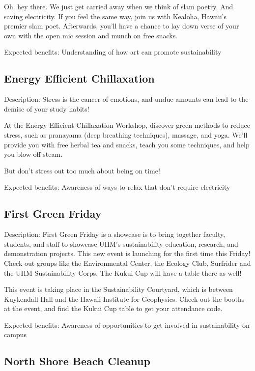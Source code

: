 Oh. hey there. We just get carried away when we think of slam poetry. And saving electricity. If you feel the same way, join us with Kealoha, Hawaii's premier slam poet. Afterwards, you'll have a chance to lay down verse of your own with the open mic session and munch on free snacks.

Expected benefits: Understanding of how art can promote sustainability


\subsection{Energy Efficient Chillaxation}

Description: Stress is the cancer of emotions, and undue amounts can lead to the demise of your study habits!

At the Energy Efficient Chillaxation Workshop, discover green methods to reduce stress, such as pranayama (deep breathing techniques), massage, and yoga. We'll provide you with free herbal tea and snacks, teach you some techniques, and help you blow off steam.

But don’t stress out too much about being on time!

Expected benefits: Awareness of ways to relax that don't require electricity


\subsection{First Green Friday}

Description: First Green Friday is a showcase is to bring together faculty, students, and staff to showcase UHM's sustainability education, research, and demonstration projects. This new event is launching for the first time this Friday! Check out groups like the Environmental Center, the Ecology Club, Surfrider and the UHM Sustainability Corps. The Kukui Cup will have a table there as well!

This event is taking place in the Sustainability Courtyard, which is between Kuykendall Hall and the Hawaii Institute for Geophysics. Check out the booths at the event, and find the Kukui Cup table to get your attendance code.

Expected benefits: Awareness of opportunities to get involved in sustainability on campus


\subsection{North Shore Beach Cleanup}

